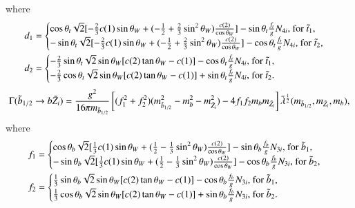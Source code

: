 \documentclass[final,3p,times]{elsarticle}
\begin{document}
where
\begin{align}
d_{1} &= \begin{cases} 
		\cos\theta_t \sqrt{2} [-{2 \over 3}c(1) \sin\theta_W + (-{1 \over 2} + {2 \over 3}\sin^2 \theta_W){c(2) \over \cos\theta_W}] - \sin\theta_t {f_t \over g} N_{4i} $, for $\tilde{t}_1$,$ \\
		-\sin\theta_t \sqrt{2} [-{2 \over 3}c(1) \sin\theta_W + (-{1 \over 2} + {2 \over 3}\sin^2 \theta_W){c(2) \over \cos\theta_W}] - \cos\theta_t {f_t \over g} N_{4i} $, for $\tilde{t}_2$,$ \\
		\end{cases} \\
d_{2} &= \begin{cases}
		-{2 \over 3} \sin\theta_t \sqrt{2} \sin\theta_W [c(2)\tan\theta_W - c(1)] - \cos\theta_t {f_t \over g}N_{4i} $, for $\tilde{t}_1 $,$\\
		-{2 \over 3} \cos\theta_t \sqrt{2} \sin\theta_W [c(2)\tan\theta_W - c(1)] + \sin\theta_t {f_t \over g}N_{4i}  $, for $\tilde{t}_2.\\
		\end{cases}
\end{align}
\begin{equation} \label{sbbneutNMSSM}
\Gamma(\tilde{b}_{1/2} \rightarrow b \tilde{Z}_i) = {g^2 \over 16 \pi m_{\tilde{b}_{1/2}}}\left[(f_{1}^2 + f_{2}^2)(m_{\tilde{b}_{1/2}}^2 - m_{b}^2 - m_{\tilde{Z}_i}^2) - 4f_{1}f_{2}m_{b}m_{\tilde{Z}_i}\right]\tilde{\lambda}^{1 \over 2}(m_{\tilde{b}_{1/2}},m_{\tilde{Z}_i},m_{b}),
\end{equation}
where
\begin{align}
f_{1} &= \begin{cases}
		\cos\theta_b \sqrt{2} [{1 \over 3}c(1) \sin\theta_W + ({1 \over 2} - {1 \over 3}\sin^2 \theta_W){c(2) \over \cos\theta_W}] - \sin\theta_b {f_b \over g} N_{3i} $, for $\tilde{b}_1$,$ \\
		-\sin\theta_b \sqrt{2} [{1 \over 3}c(1) \sin\theta_W + ({1 \over 2} - {1 \over 3}\sin^2 \theta_W){c(2) \over \cos\theta_W}] - \cos\theta_b {f_b \over g} N_{3i} $, for $\tilde{b}_2$,$ \\
		\end{cases} \\
f_{2} &= \begin{cases}
		{1 \over 3} \sin\theta_b \sqrt{2} \sin\theta_W [c(2)\tan\theta_W - c(1)] - \cos\theta_b {f_b \over g}N_{3i} $, for $\tilde{b}_1$,$ \\
		{1 \over 3} \cos\theta_b \sqrt{2} \sin\theta_W [c(2)\tan\theta_W - c(1)] + \sin\theta_b {f_b \over g}N_{3i}  $, for $\tilde{b}_2. \\
		\end{cases}
\end{align}
\end{document}
